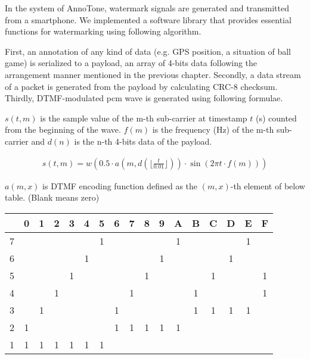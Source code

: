In the system of AnnoTone, watermark signals are generated and transmitted from a smartphone.
We implemented a software library that provides essential functions for watermarking using following algorithm. %

First, an annotation of any kind of data (e.g. GPS position, a situation of ball game) is serialized to a payload, an array of 4-bits data following the arrangement manner mentioned in the previous chapter.
Secondly, a data stream of a packet is generated from the payload by calculating CRC-8 checksum.
Thirdly, DTMF-modulated pcm wave is generated using following formulae.

$s(t, m)$ is the sample value of the m-th sub-carrier at timestamp $t$ (s) counted from the beginning of the wave. $f(m)$ is the frequency (Hz) of the m-th sub-carrier and $d(n)$ is the n-th 4-bits data of the payload.

\begin{align}
s(t, m) = w( 0.5 \cdot a(m, d(\lfloor \frac{t}{0.01} \rfloor)) \cdot \sin{(2 \pi t \cdot f(m))} )
\end{align}

$a(m, x)$ is DTMF encoding function defined as the $(m, x)$-th element of below table.
(Blank means zero)

\begin{table}[ht]
\begin{center}
	\begin{tabular}{|c||c|c|c|c|c|c|c|c|c|c|c|c|c|c|c|c|} \hline
		  & 0 & 1 & 2 & 3 & 4 & 5 & 6 & 7 & 8 & 9 & A & B & C & D & E & F \\ \hline \hline
		7 &   &   &   &   &   & 1 &   &   &   &   & 1 &   &   &   & 1 &   \\ \hline
		6 &   &   &   &   & 1 &   &   &   &   & 1 &   &   &   & 1 &   &   \\ \hline
		5 &   &   &   & 1 &   &   &   &   & 1 &   &   &   & 1 &   &   & 1 \\ \hline
		4 &   &   & 1 &   &   &   &   & 1 &   &   &   & 1 &   &   &   & 1 \\ \hline
		3 &   & 1 &   &   &   &   & 1 &   &   &   &   & 1 & 1 & 1 & 1 &   \\ \hline
		2 & 1 &   &   &   &   &   & 1 & 1 & 1 & 1 & 1 &   &   &   &   &   \\ \hline
		1 & 1 & 1 & 1 & 1 & 1 & 1 &   &   &   &   &   &   &   &   &   &   \\ \hline
	\end{tabular}
\end{center}
\end{table}

